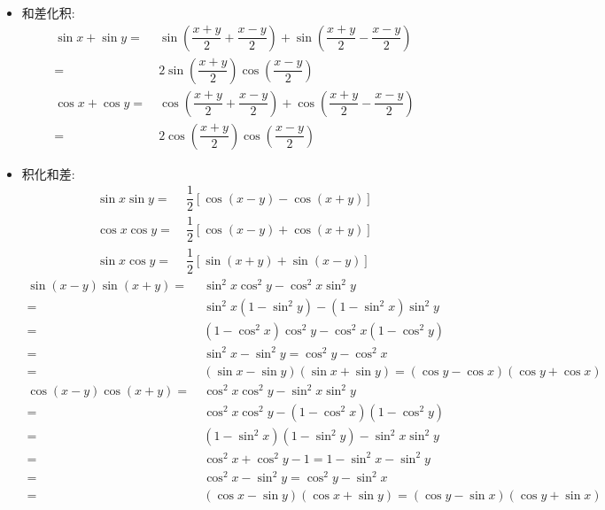\begin{itemize}[leftmargin=\inteval{\myitemleftmargin}pt,itemsep=
   \inteval{\myitemitempsep}pt,topsep=\inteval{\myitemtopsep}pt]
\item 和差化积:
\begin{align*}
\sin x+\sin y=&\  \sin \left(\dfrac{x+y}{2} +\dfrac{x-y}{2} \right) +\sin \left(\dfrac{x+y}{2}-\dfrac{x-y}{2} \right)\\
=&\  2\sin \left(\dfrac{x+y}{2}\right) \cos\left(\dfrac{x-y}{2}\right) \\ 
\cos x+\cos y=&\  \cos \left(\dfrac{x+y}{2} +\dfrac{x-y}{2} \right) +\cos \left(\dfrac{x+y}{2}-\dfrac{x-y}{2} \right)\\
=&\  2\cos \left(\dfrac{x+y}{2}\right) \cos  \left(\dfrac{x-y}{2}\right)	
\end{align*}
\item 积化和差:
\begin{align*}
\sin x\sin y=&\ \dfrac{1}{2}[\cos(x-y)-\cos(x+y)] \\
\cos x\cos y=&\ \dfrac{1}{2}[\cos(x-y)+\cos(x+y)] \\	
\sin x\cos y=&\ \dfrac{1}{2}[\sin(x+y)+\sin(x-y)] 
\end{align*}
\begin{align*}
\sin(x-y)\sin(x+y) =&\ \sin^2x\cos^2y-\cos^2x\sin^2y \\
=&\ \sin^2x(1-\sin^2y)-(1-\sin^2x)\sin^2y \\
=&\ (1-\cos^2x)\cos^2y-\cos^2x(1-\cos^2y) \\
=&\ \sin^2 x-\sin^2y=\cos^2 y-\cos^2 x \\
=&\ (\sin x-\sin y)(\sin x+\sin y)=(\cos y-\cos x)(\cos y+\cos x) \\
\cos(x-y)\cos(x+y) =&\ \cos^2x\cos^2y-\sin^2x\sin^2y \\
=&\ \cos^2x\cos^2y-(1-\cos^2x)(1-\cos^2y) \\
=&\ (1-\sin^2x)(1-\sin^2y)-\sin^2x\sin^2y \\
=&\ \cos^2 x+\cos^2 y-1=1-\sin^2 x-\sin^2 y \\
=&\ \cos^2 x-\sin^2 y=\cos^2 y-\sin^2 x \\
=&\ (\cos x-\sin y)(\cos x+\sin y)=(\cos y-\sin x)(\cos y+\sin x)
\end{align*}


\end{itemize}
